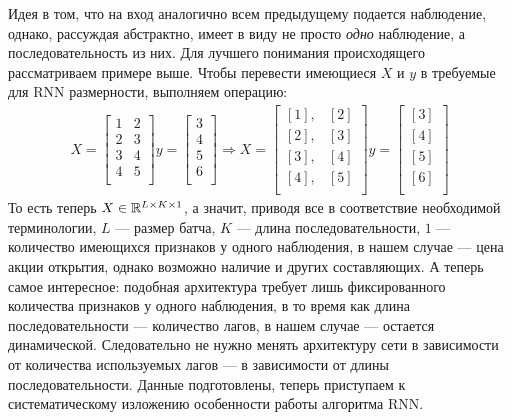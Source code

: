 Идея в том, что на вход аналогично всем предыдущему подается наблюдение, однако, рассуждая абстрактно, имеет в виду не просто \textit{одно} наблюдение, а последовательность из них. Для лучшего понимания происходящего рассматриваем примере выше. Чтобы перевести имеющиеся $X$ и $y$ в требуемые для RNN размерности, выполняем операцию:
\begin{equation}
	\begin{split}
		X = \left[\begin{matrix}
			1 & 2\\
			2 & 3\\
			3 & 4\\
			4 & 5\\
		\end{matrix}\right]
		y = \left[\begin{matrix}
			3\\
			4\\
			5\\
			6\\
		\end{matrix}\right]
		\Rightarrow
		X = \left[\begin{matrix}
			[1], & [2]\\
			[2], & [3]\\
			[3], & [4]\\
			[4], & [5]\\
		\end{matrix}\right]
		y = \left[\begin{matrix}
			[3]\\
			[4]\\
			[5]\\
			[6]\\
		\end{matrix}\right]
	\end{split}	
\end{equation}
То есть теперь $X \in \mathbb{R}^{L \times K \times 1}$, а значит, приводя все в соответствие необходимой терминологии, $L$ --- размер батча, $K$ --- длина последовательности, $1$ --- количество имеющихся признаков у одного наблюдения, в нашем случае --- цена акции открытия, однако возможно наличие и других составляющих. А теперь самое интересное: подобная архитектура требует лишь фиксированного количества признаков у одного наблюдения, в то время как длина последовательности --- количество лагов, в нашем случае --- остается динамической. Следовательно не нужно менять архитектуру сети в зависимости от количества используемых лагов --- в зависимости от длины последовательности. Данные подготовлены, теперь приступаем к систематическому изложению особенности работы алгоритма RNN.

